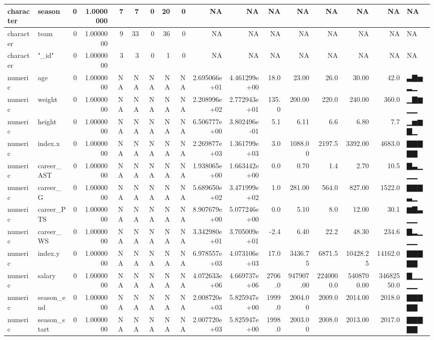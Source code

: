 \documentclass[
]{book}
\begin{document}
\begin{tabular}{l|l|r|r|r|r|r|r|r|r|r|r|r|r|r|r|l}
\hline
character & season & 0 & 1.0000000 & 7 & 7 & 0 & 20 & 0 & NA & NA & NA & NA & NA & NA & NA & NA\\
\hline
character & team & 0 & 1.0000000 & 9 & 33 & 0 & 36 & 0 & NA & NA & NA & NA & NA & NA & NA & NA\\
\hline
character & "\_id" & 0 & 1.0000000 & 3 & 3 & 0 & 1 & 0 & NA & NA & NA & NA & NA & NA & NA & NA\\
\hline
numeric & age & 0 & 1.0000000 & NA & NA & NA & NA & NA & 2.695066e+01 & 4.461299e+00 & 18.0 & 23.00 & 26.0 & 30.00 & 42.0 & ▃▇▅▂▁\\
\hline
numeric & weight & 0 & 1.0000000 & NA & NA & NA & NA & NA & 2.208996e+02 & 2.772943e+01 & 135.0 & 200.00 & 220.0 & 240.00 & 360.0 & ▁▇▆▁▁\\
\hline
numeric & height & 0 & 1.0000000 & NA & NA & NA & NA & NA & 6.506777e+00 & 3.802496e-01 & 5.1 & 6.11 & 6.6 & 6.80 & 7.7 & ▁▅▆▇▁\\
\hline
numeric & index.x & 0 & 1.0000000 & NA & NA & NA & NA & NA & 2.269877e+03 & 1.361799e+03 & 3.0 & 1088.00 & 2197.5 & 3392.00 & 4683.0 & ▇▇▇▇▇\\
\hline
numeric & career\_AST & 0 & 1.0000000 & NA & NA & NA & NA & NA & 1.938065e+00 & 1.663442e+00 & 0.0 & 0.70 & 1.4 & 2.70 & 10.5 & ▇▃▁▁▁\\
\hline
numeric & career\_G & 0 & 1.0000000 & NA & NA & NA & NA & NA & 5.689650e+02 & 3.471999e+02 & 1.0 & 281.00 & 564.0 & 827.00 & 1522.0 & ▇▇▇▃▁\\
\hline
numeric & career\_PTS & 0 & 1.0000000 & NA & NA & NA & NA & NA & 8.907679e+00 & 5.077246e+00 & 0.0 & 5.10 & 8.0 & 12.00 & 30.1 & ▆▇▃▁▁\\
\hline
numeric & career\_WS & 0 & 1.0000000 & NA & NA & NA & NA & NA & 3.342980e+01 & 3.705009e+01 & -2.4 & 6.40 & 22.2 & 48.30 & 234.6 & ▇▂▁▁▁\\
\hline
numeric & index.y & 0 & 1.0000000 & NA & NA & NA & NA & NA & 6.978557e+03 & 4.073106e+03 & 17.0 & 3436.75 & 6871.5 & 10428.25 & 14162.0 & ▇▇▇▇▇\\
\hline
numeric & salary & 0 & 1.0000000 & NA & NA & NA & NA & NA & 4.072633e+06 & 4.669737e+06 & 2706.0 & 947907.00 & 2240000.0 & 5408700.00 & 34682550.0 & ▇▁▁▁▁\\
\hline
numeric & season\_end & 0 & 1.0000000 & NA & NA & NA & NA & NA & 2.008720e+03 & 5.825947e+00 & 1999.0 & 2004.00 & 2009.0 & 2014.00 & 2018.0 & ▇▇▇▇▇\\
\hline
numeric & season\_start & 0 & 1.0000000 & NA & NA & NA & NA & NA & 2.007720e+03 & 5.825947e+00 & 1998.0 & 2003.00 & 2008.0 & 2013.00 & 2017.0 & ▇▇▇▇▇\\

\end{tabular}
\end{document}
